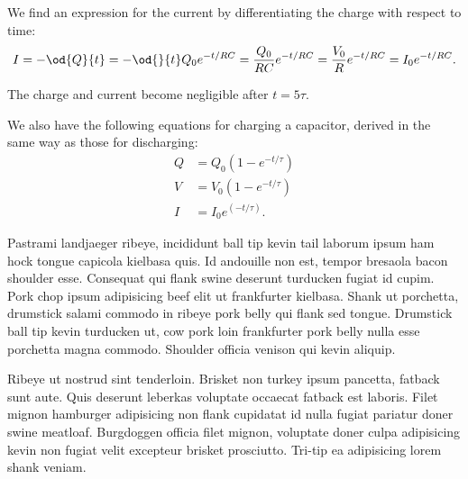 We find an expression for the current by differentiating the charge with respect to time:
\begin{equation}
  I = -\od{Q}{t} = -\od{}{t} Q_0 e^{-t/RC} = \frac{Q_0}{RC} e^{-t/RC} = \frac{V_0}{R} e^{-t/RC} = I_0 e^{-t/RC}.
\end{equation}

The charge and current become negligible after $ t = 5\tau $.

We also have the following equations for charging a capacitor, derived in the same way as those for discharging:
\begin{align}
  Q &= Q_0 (1 - e^{-t/\tau})\\
  V &= V_0 (1 - e^{-t/\tau})\\
  I &= I_0 e^{(-t/\tau)}.
\end{align}


Pastrami landjaeger ribeye, incididunt ball tip kevin tail laborum ipsum ham hock tongue capicola kielbasa quis. Id andouille non est, tempor bresaola bacon shoulder esse. Consequat qui flank swine deserunt turducken fugiat id cupim. Pork chop ipsum adipisicing beef elit ut frankfurter kielbasa. Shank ut porchetta, drumstick salami commodo in ribeye pork belly qui flank sed tongue. Drumstick ball tip kevin turducken ut, cow pork loin frankfurter pork belly nulla esse porchetta magna commodo. Shoulder officia venison qui kevin aliquip.

Ribeye ut nostrud sint tenderloin. Brisket non turkey ipsum pancetta, fatback sunt aute. Quis deserunt leberkas voluptate occaecat fatback est laboris. Filet mignon hamburger adipisicing non flank cupidatat id nulla fugiat pariatur doner swine meatloaf. Burgdoggen officia filet mignon, voluptate doner culpa adipisicing kevin non fugiat velit excepteur brisket prosciutto. Tri-tip ea adipisicing lorem shank veniam.
